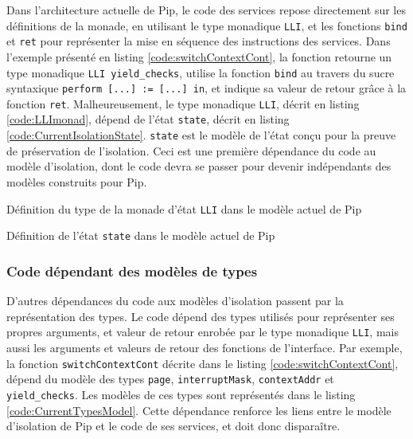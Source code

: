 			Dans l'architecture actuelle de Pip, le code des services repose directement sur les définitions de la monade, en utilisant le type monadique \texttt{LLI}, et les fonctions \texttt{bind} et \texttt{ret} pour représenter la mise en séquence des instructions des services. Dans l'exemple présenté en listing \ref{code:switchContextCont}, la fonction retourne un type monadique \texttt{LLI yield\_checks}, utilise la fonction \texttt{bind} au travers du sucre syntaxique \texttt{perform [...] := [...] in}, et indique sa valeur de retour grâce à la fonction \texttt{ret}.
			Malheureusement, le type monadique \texttt{LLI}, décrit en listing \ref{code:LLImonad}, dépend de l'état \texttt{state}, décrit en listing \ref{code:CurrentIsolationState}. \texttt{state} est le modèle de l'état conçu pour la preuve de préservation de l'isolation. Ceci est une première dépendance du code au modèle d'isolation, dont le code devra se passer pour devenir indépendants des modèles construits pour Pip.

			\begin{listing}[!ht]
				\caption{Définition du type de la monade d'état \texttt{LLI} dans le modèle actuel de Pip}
				\label{code:LLImonad}
			\end{listing}

			\begin{listing}[!ht]
				\caption{Définition de l'état \texttt{state} dans le modèle actuel de Pip}
				\label{code:CurrentIsolationState}
			\end{listing}

			\subsubsection{Code dépendant des modèles de types}

			D'autres dépendances du code aux modèles d'isolation passent par la représentation des types. Le code dépend des types utilisés pour représenter ses propres arguments, et valeur de retour enrobée par le type monadique \texttt{LLI}, mais aussi les arguments et valeurs de retour des fonctions de l'interface. Par exemple, la fonction \texttt{switchContextCont} décrite dans le listing \ref{code:switchContextCont}, dépend du modèle des types \texttt{page}, \texttt{interruptMask}, \texttt{contextAddr} et \texttt{yield\_checks}. Les modèles de ces types sont représentés dans le listing \ref{code:CurrentTypesModel}.
Cette dépendance renforce les liens entre le modèle d'isolation de Pip et le code de ses services, et doit donc disparaître.

